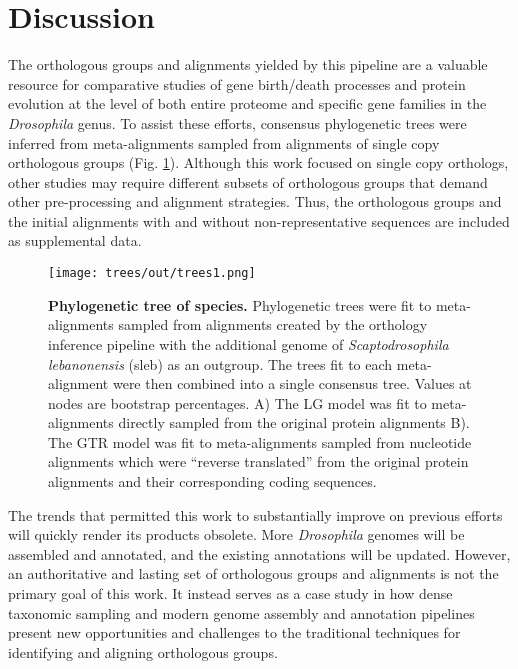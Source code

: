 \documentclass[10pt,letterpaper]{article}
\begin{document}
\section*{Discussion}
The orthologous groups and alignments yielded by this pipeline are a valuable resource for comparative studies of gene birth/death processes and protein evolution at the level of both entire proteome and specific gene families in the \textit{Drosophila} genus. To assist these efforts, consensus phylogenetic trees were inferred from meta-alignments sampled from alignments of single copy orthologous groups (Fig. \ref{fig:trees}). Although this work focused on single copy orthologs, other studies may require different subsets of orthologous groups that demand other pre-processing and alignment strategies. Thus, the orthologous groups and the initial alignments with and without non-representative sequences are included as supplemental data.

\begin{figure}[h!]
\texttt{[image: trees/out/trees1.png]}
\centering
\caption{\textbf{Phylogenetic tree of species.}
Phylogenetic trees were fit to meta-alignments sampled from alignments created by the orthology inference pipeline with the additional genome of \textit{Scaptodrosophila lebanonensis} (sleb) as an outgroup. The trees fit to each meta-alignment were then combined into a single consensus tree. Values at nodes are bootstrap percentages. A) The LG model was fit to meta-alignments directly sampled from the original protein alignments B). The GTR model was fit to meta-alignments sampled from nucleotide alignments which were “reverse translated” from the original protein alignments and their corresponding coding sequences.}
\label{fig:trees}
\end{figure}

The trends that permitted this work to substantially improve on previous efforts will quickly render its products obsolete. More \textit{Drosophila} genomes will be assembled and annotated, and the existing annotations will be updated. However, an authoritative and lasting set of orthologous groups and alignments is not the primary goal of this work. It instead serves as a case study in how dense taxonomic sampling and modern genome assembly and annotation pipelines present new opportunities and challenges to the traditional techniques for identifying and aligning orthologous groups.
\end{document}
